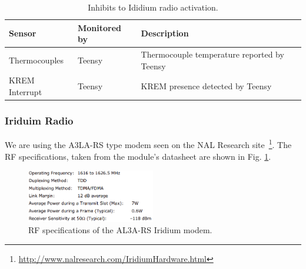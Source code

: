 \documentclass{article}
\begin{document}
\begin{table}[H]
	\caption{Inhibits to Ididium radio activation.}
	\label{tab:radio-inhibits}
	\centering
	\begin{tabular}{l|l|l}
		Sensor & Monitored by     &  Description  \\
		\hline
		
		Thermocouples & Teensy  & Thermocouple temperature reported by Teensy\\
		KREM Interrupt	 & Teensy  & KREM presence detected by Teensy
	\end{tabular}
	
\end{table}



\subsubsection{Iriduim Radio}
We are using the A3LA-RS type modem seen on the NAL Research site~\footnote{ \url{http://www.nalresearch.com/IridiumHardware.html}}. The RF specifications, taken from the module's datasheet are shown in Fig. \ref{fig:iridium-rf-specs}.

\begin{figure}[H]
    \centering
    \includegraphics[width=0.5\textwidth]{images/iridium-rf-specs.png}
    \caption{RF specifications of the AL3A-RS Iridium modem.}
    \label{fig:iridium-rf-specs}
\end{figure}
\end{document}
